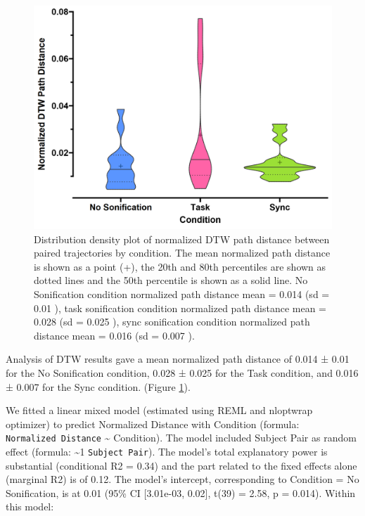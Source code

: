 \documentclass[10pt,a4paper,onecolumn]{article}
\begin{document}
\begin{figure}[h]

{\centering \includegraphics[width=1\linewidth]{figures/dtw_summary} 

}

\caption{Distribution density plot of normalized DTW path distance between paired trajectories by condition. The mean normalized path distance is shown as a point (+), the 20th and 80th percentiles are shown as dotted lines and the 50th percentile is shown as a solid line. No Sonification condition normalized path distance mean  =  0.014 (sd =  0.01 ), task sonification condition normalized path distance mean =  0.028 (sd =  0.025 ), sync sonification condition normalized path distance mean =  0.016 (sd =  0.007 ).}\label{fig:dtw-plot}
\end{figure}

Analysis of DTW results gave a mean normalized path distance of 0.014 ± 0.01 for the No Sonification condition,
0.028 ± 0.025 for the Task condition, and
0.016 ± 0.007 for the Sync condition. (Figure \ref{fig:dtw-plot}).

We fitted a linear mixed model (estimated using REML and nloptwrap optimizer) to predict Normalized Distance with Condition (formula: \texttt{Normalized\ Distance} \textasciitilde{} Condition). The model included Subject Pair as random effect (formula: \textasciitilde1 \textbar{} \texttt{Subject\ Pair}). The model's total explanatory power is substantial (conditional R2 = 0.34) and the part related to the fixed effects alone (marginal R2) is of 0.12. The model's intercept, corresponding to Condition = No Sonification, is at 0.01 (95\% CI {[}3.01e-03, 0.02{]}, t(39) = 2.58, p = 0.014). Within this model:
\end{document}
